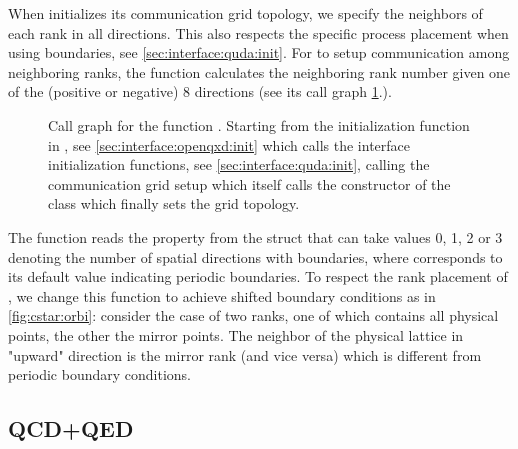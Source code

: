 When \quda initializes its communication grid topology, we specify the neighbors of each rank in all directions. This also respects the specific process placement when using \Cstar boundaries, see \cref{sec:interface:quda:init}. For \quda to setup communication among neighboring ranks, the function  calculates the neighboring rank number given one of the (positive or negative) 8 directions (see its call graph \cref{fig:comm_rank_displaced}.).
\begin{figure}
  
  \caption{Call graph for the function . Starting from the initialization function  in \openqxd, see \cref{sec:interface:openqxd:init} which calls the interface initialization functions, see \cref{sec:interface:quda:init}, calling the communication grid setup which itself calls the constructor of the  class which finally sets the grid topology.}
  \label{fig:comm_rank_displaced}
\end{figure}
The function reads the  property from the  struct that can take values \num{0}, \num{1}, \num{2} or \num{3} denoting the number of spatial directions with \Cstar boundaries, where  corresponds to its default value indicating periodic boundaries.
To respect the rank placement of \openqxd, we change this function to achieve shifted boundary conditions as in \cref{fig:cstar:orbi}: consider the case of two ranks, one of which contains all physical points, the other the mirror points. The neighbor of the physical lattice in "upward" direction is the mirror rank (and vice versa) which is different from periodic boundary conditions.

\subsection{QCD+QED}
\label{sec:interface:qcd+qed}


